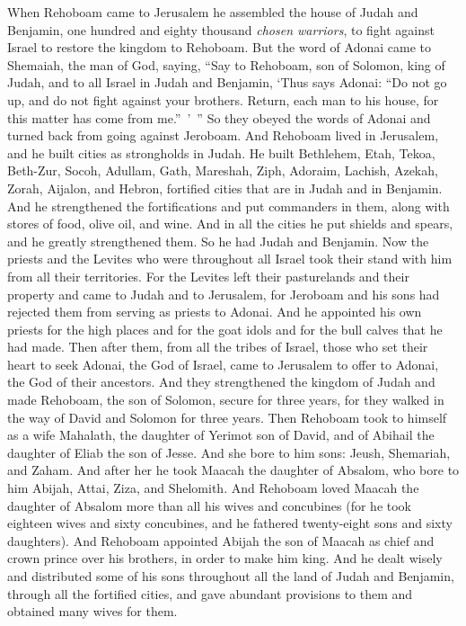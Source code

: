 \begin{biblechapter} %
 When Rehoboam came to Jerusalem he assembled the house of Judah and Benjamin, one hundred and eighty thousand \textit{chosen warriors}, to fight against Israel to restore the kingdom to Rehoboam.
\verse But the word of Adonai came to Shemaiah, the man of God, saying,
\verse “Say to Rehoboam, son of Solomon, king of Judah, and to all Israel in Judah and Benjamin,
\verse ‘Thus says Adonai: “Do not go up, and do not fight against your brothers. Return, each man to his house, for this matter has come from me.” ’ ” So they obeyed the words of Adonai and turned back from going against Jeroboam.
\verse And Rehoboam lived in Jerusalem, and he built cities as strongholds in Judah.
\verse He built Bethlehem, Etah, Tekoa,
\verse Beth-Zur, Socoh, Adullam,
\verse Gath, Mareshah, Ziph,
\verse Adoraim, Lachish, Azekah,
\verse Zorah, Aijalon, and Hebron, fortified cities that are in Judah and in Benjamin.
\verse And he strengthened the fortifications and put commanders in them, along with stores of food, olive oil, and wine.
\verse And in all the cities he put shields and spears, and he greatly strengthened them. So he had Judah and Benjamin.
 Now the priests and the Levites who were throughout all Israel took their stand with him from all their territories.
\verse For the Levites left their pasturelands and their property and came to Judah and to Jerusalem, for Jeroboam and his sons had rejected them from serving as priests to Adonai.
\verse And he appointed his own priests for the high places and for the goat idols and for the bull calves that he had made.
\verse Then after them, from all the tribes of Israel, those who set their heart to seek Adonai, the God of Israel, came to Jerusalem to offer to Adonai, the God of their ancestors.
\verse And they strengthened the kingdom of Judah and made Rehoboam, the son of Solomon, secure for three years, for they walked in the way of David and Solomon for three years.
 Then Rehoboam took to himself as a wife Mahalath, the daughter of Yerimot son of David, and of Abihail the daughter of Eliab the son of Jesse.
\verse And she bore to him sons: Jeush, Shemariah, and Zaham.
\verse And after her he took Maacah the daughter of Absalom, who bore to him Abijah, Attai, Ziza, and Shelomith.
\verse And Rehoboam loved Maacah the daughter of Absalom more than all his wives and concubines (for he took eighteen wives and sixty concubines, and he fathered twenty-eight sons and sixty daughters).
\verse And Rehoboam appointed Abijah the son of Maacah as chief and crown prince over his brothers, in order to make him king.
\verse And he dealt wisely and distributed some of his sons throughout all the land of Judah and Benjamin, through all the fortified cities, and gave abundant provisions to them and obtained many wives for them.
\end{biblechapter}

